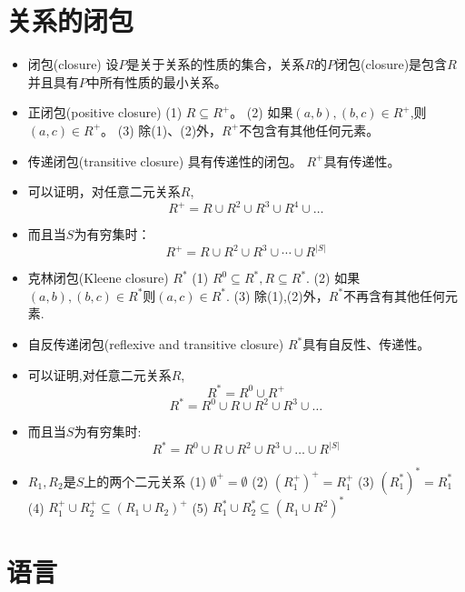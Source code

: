 \section{关系的闭包}
\begin{itemize}
	\item 闭包(closure)
		\subitem 设$P$是关于关系的性质的集合，关系$R$的$P$闭包(closure)是包含$R$并且具有$P$中所有性质的最小关系。
	\item 正闭包(positive closure)
		\subitem(1) $R\subseteq R^{+}$。
		\subitem(2) 如果$(a,b),(b,c) \in R^{+}$,则$(a,c)\in R^{+}$。
		\subitem(3) 除(1)、(2)外，$R^{+}$不包含有其他任何元素。
	\item 传递闭包(transitive closure)
	   	\subitem{-} 具有传递性的闭包。
	   	\subitem{-} $R^{+}$具有传递性。
	\item 可以证明，对任意二元关系$R$,
			$$R^{+} = R\cup R^2 \cup R^3 \cup R^4 \cup \dots$$
	\item 而且当$S$为有穷集时：
			\[R^{+} = R\cup R^2 \cup R^3 \cup \cdots \cup R^{|S|} \]
	\item 克林闭包(Kleene closure) $R^{\ast}$
		\subitem(1) $R^0 \subseteq R^*,R\subseteq R^{\ast}$.
		\subitem(2) 如果$(a,b),(b,c)\in R^{\ast}$则$(a,c)\in R^{\ast}$.
		\subitem(3) 除(1),(2)外，$R^{\ast}$不再含有其他任何元素.
	\item 自反传递闭包(reflexive and transitive closure)
		\subitem $R^{\ast}$具有自反性、传递性。
	\item 可以证明,对任意二元关系$R$,
	\[R^{\ast} =R^{0}\cup R^{+} \]
	\[R^{\ast} =R^{0}\cup R\cup R^{2}\cup R^{3}\cup \dots \]
	\item 而且当$S$为有穷集时:
	\[R^{\ast} =R^{0}\cup R\cup R^{2}\cup R^{3}\cup \dots \cup R^{|S|} \]
	\item $R_1,R_2$是$S$上的两个二元关系
		\subitem(1) $\emptyset^{+}=\emptyset$
		\subitem(2) $(R_1^{+})^{+} = R_1^{+}$
		\subitem(3) $(R_1^{\ast})^{\ast} = R_1^{\ast}$
		\subitem(4) $R_1^{+}\cup R_2^{+} \subseteq (R_1 \cup R_2)^{+}$
		\subitem(5) $R_1^{\ast}\cup R_2^{\ast} \subseteq (R_1\cup R^2)^{\ast}$		
\end{itemize}

\section{语言}
